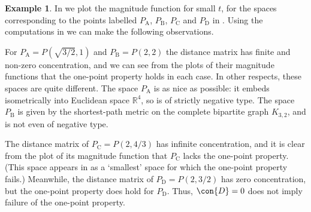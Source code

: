 \documentclass[a4paper, oneside, reqno]{amsart}
\theoremstyle{definition}
\newtheorem{example}[theorem]{Example}
\theoremstyle{remark}
\numberwithin{equation}{section}
\newcommand{\R}{\mathbb{R}}
\begin{document}
\begin{example}
\label{eg:5pt-spaces-1pt-prop} 
    In  we plot the magnitude function for small \(t\), for the spaces corresponding to the points labelled \(P_{\mathrm{A}}\), \(P_{\mathrm{B}}\), \(P_{\mathrm{C}}\) and \(P_{\mathrm{D}}\) in . Using the computations in  we can make the following observations.

    For \(P_{\mathrm{A}} = P(\sqrt{3/2}, 1)\) and \(P_{\mathrm{B}} = P(2,2)\) the distance matrix has finite and non-zero concentration, and we can see from the plots of their magnitude functions that the one-point property holds in each case. In other respects, these spaces are quite different. The space \(P_{\mathrm{A}}\) is as nice as possible: it embeds isometrically into Euclidean space \(\R^4\), so is of strictly negative type. The space \(P_{\mathrm{B}}\) is given by the shortest-path metric on the complete bipartite graph \(K_{3,2}\), and is not even of negative type.

    The distance matrix of \(P_{\mathrm{C}} = P(2,4/3)\) has infinite concentration, and it is clear from the plot of its magnitude function that \(P_{\mathrm{C}}\) lacks the one-point property. (This space appears in \cite[Example~3.4]{RoffYoshinaga} as a `smallest' space for which the one-point property fails.) Meanwhile, the distance matrix of \(P_{\mathrm{D}}=P(2,3/2)\) has zero concentration, but the one-point property does hold for \(P_{\mathrm{D}}\). Thus, \(\con{D} = 0\) does not imply failure of the one-point property. 
\end{example}
\end{document}
